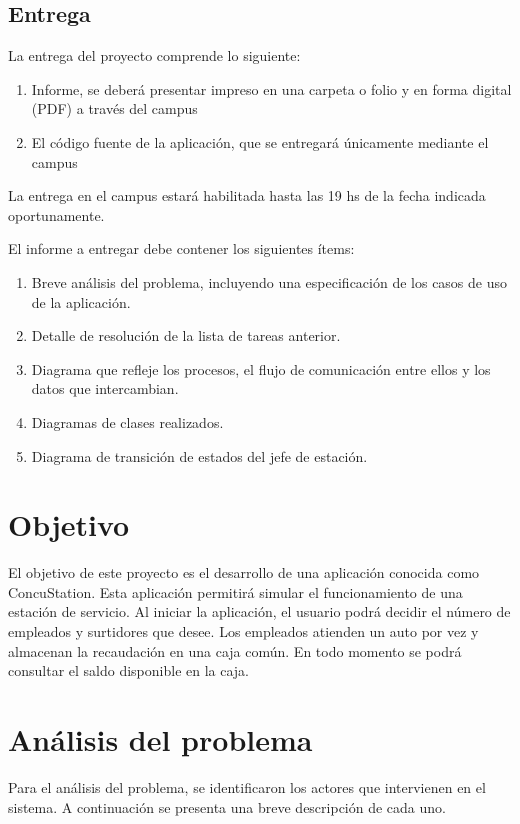 \documentclass[12pt,a4paper,titlepage,oneside]{article}
\begin{document}
\subsection{Entrega} 

La entrega del proyecto comprende lo siguiente:

\begin{enumerate}
\item
Informe, se deberá presentar impreso en una carpeta o folio y en forma digital (PDF) a través del campus
\item
El código fuente de la aplicación, que se entregará únicamente mediante el campus
\end{enumerate}

La entrega en el campus estará habilitada hasta las 19 hs de la fecha indicada oportunamente.

El informe a entregar debe contener los siguientes ítems:

\begin{enumerate}
\item
Breve análisis del problema, incluyendo una especificación de los casos de uso de la aplicación.
\item
Detalle de resolución de la lista de tareas anterior.
\item
Diagrama que refleje los procesos, el flujo de comunicación entre ellos y los datos que intercambian.
\item
Diagramas de clases realizados.
\item
Diagrama de transición de estados del jefe de estación.
\end{enumerate}

\section{Objetivo}
El objetivo de este proyecto es el desarrollo de una aplicación conocida como ConcuStation.
Esta aplicación permitirá simular el funcionamiento de una estación de servicio. Al iniciar la aplicación, el usuario podrá decidir el número de empleados y surtidores que desee.
Los empleados atienden un auto por vez y almacenan la recaudación en una caja común. En todo momento se podrá consultar el saldo disponible en la caja.

\section{Análisis del problema}
Para el análisis del problema, se identificaron los actores que intervienen en el sistema. A continuación se presenta una breve descripción de cada uno.
\end{document}
